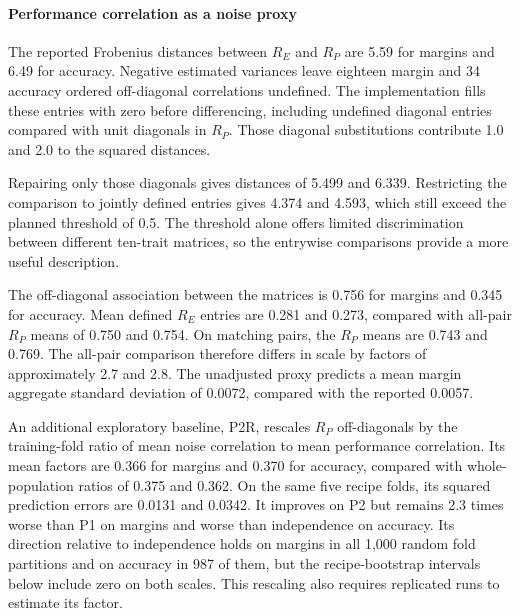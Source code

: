 \paragraph{Performance correlation as a noise proxy}
The reported Frobenius distances between $R_E$ and $R_P$ are 5.59 for margins and 6.49 for accuracy. Negative estimated variances leave eighteen margin and 34 accuracy ordered off-diagonal correlations undefined. The implementation fills these entries with zero before differencing, including undefined diagonal entries compared with unit diagonals in $R_P$. Those diagonal substitutions contribute 1.0 and 2.0 to the squared distances.

Repairing only those diagonals gives distances of 5.499 and 6.339. Restricting the comparison to jointly defined entries gives 4.374 and 4.593, which still exceed the planned threshold of 0.5. The threshold alone offers limited discrimination between different ten-trait matrices, so the entrywise comparisons provide a more useful description.

The off-diagonal association between the matrices is 0.756 for margins and 0.345 for accuracy. Mean defined $R_E$ entries are 0.281 and 0.273, compared with all-pair $R_P$ means of 0.750 and 0.754. On matching pairs, the $R_P$ means are 0.743 and 0.769. The all-pair comparison therefore differs in scale by factors of approximately 2.7 and 2.8. The unadjusted proxy predicts a mean margin aggregate standard deviation of 0.0072, compared with the reported 0.0057.

An additional exploratory baseline, P2R, rescales $R_P$ off-diagonals by the training-fold ratio of mean noise correlation to mean performance correlation. Its mean factors are 0.366 for margins and 0.370 for accuracy, compared with whole-population ratios of 0.375 and 0.362. On the same five recipe folds, its squared prediction errors are 0.0131 and 0.0342. It improves on P2 but remains 2.3 times worse than P1 on margins and worse than independence on accuracy. Its direction relative to independence holds on margins in all 1,000 random fold partitions and on accuracy in 987 of them, but the recipe-bootstrap intervals below include zero on both scales. This rescaling also requires replicated runs to estimate its factor.


